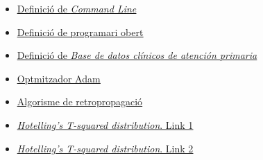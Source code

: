 \documentclass[a4paper,12pt]{report}
\begin{document}
\begin{itemize}
    \item \href{https://es.wikipedia.org/wiki/Interfaz_de_línea_de_comandos}{\underline{Definició de \textit{Command Line}}}
    \item \href{https://www.ibm.com/es-es/topics/open-source}{\underline{Definició de programari obert}}
    \item \href{https://www.sanidad.gob.es/estadEstudios/estadisticas/estadisticas/estMinisterio/SIAP/home.htm}{\underline{Definició de \textit{Base de datos clínicos de atención primaria}}}
    \item \href{https://www.askpython.com/python/examples/adam-optimizer}{\underline{Optmitzador Adam}}
    \item \href{https://www.askpython.com/python/examples/backpropagation-in-python}{\underline{Algorisme de retropropagació}}
    \item \href{https://online.stat.psu.edu/stat505/lesson/7/7.1/7.1.3}{\underline{\textit{Hotelling's T-squared distribution}. Link 1}}
    \item \href{https://www.itl.nist.gov/div898/handbook/pmc/section5/pmc543.htm}{\underline{\textit{Hotelling's T-squared distribution}. Link 2}}
\end{itemize}
\end{document}
